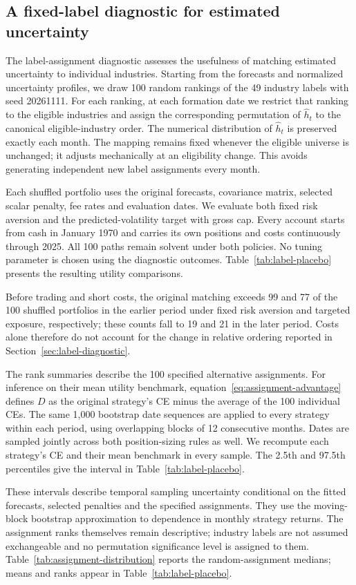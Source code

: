 \subsection{A fixed-label diagnostic for estimated uncertainty}
\label{app:label-placebo}
The label-assignment diagnostic assesses the usefulness of matching estimated uncertainty to individual industries. Starting from the forecasts and normalized uncertainty profiles, we draw 100 random rankings of the 49 industry labels with seed 20261111. For each ranking, at each formation date we restrict that ranking to the eligible industries and assign the corresponding permutation of $\widehat h_t$ to the canonical eligible-industry order. The numerical distribution of $\widehat h_t$ is preserved exactly each month. The mapping remains fixed whenever the eligible universe is unchanged; it adjusts mechanically at an eligibility change. This avoids generating independent new label assignments every month.

Each shuffled portfolio uses the original forecasts, covariance matrix, selected scalar penalty, fee rates and evaluation dates. We evaluate both fixed risk aversion and the predicted-volatility target with gross cap. Every account starts from cash in January 1970 and carries its own positions and costs continuously through 2025. All 100 paths remain solvent under both policies. No tuning parameter is chosen using the diagnostic outcomes.
Table~\ref{tab:label-placebo} presents the resulting utility comparisons.

Before trading and short costs, the original matching exceeds 99 and 77 of the 100 shuffled portfolios in the earlier period under fixed risk aversion and targeted exposure, respectively; these counts fall to 19 and 21 in the later period. Costs alone therefore do not account for the change in relative ordering reported in Section~\ref{sec:label-diagnostic}.

The rank summaries describe the 100 specified alternative assignments. For inference on their mean utility benchmark, equation~\eqref{eq:assignment-advantage} defines $D$ as the original strategy's CE minus the average of the 100 individual CEs. The same 1,000 bootstrap date sequences are applied to every strategy within each period, using overlapping blocks of 12 consecutive months. Dates are sampled jointly across both position-sizing rules as well. We recompute each strategy's CE and their mean benchmark in every sample. The 2.5th and 97.5th percentiles give the interval in Table~\ref{tab:label-placebo}.

These intervals describe temporal sampling uncertainty conditional on the fitted forecasts, selected penalties and the specified assignments. They use the moving-block bootstrap approximation to dependence in monthly strategy returns. The assignment ranks themselves remain descriptive; industry labels are not assumed exchangeable and no permutation significance level is assigned to them. Table~\ref{tab:assignment-distribution} reports the random-assignment medians; means and ranks appear in Table~\ref{tab:label-placebo}.

\FloatBarrier
